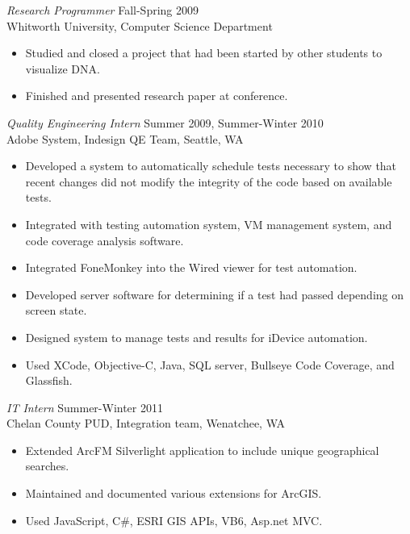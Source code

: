 \documentclass[line,margin]{res}
\begin{document}
\begin{resume}
                {\sl Research Programmer} \hfill             Fall-Spring 2009 \\
                Whitworth University, Computer Science Department
                 \begin{itemize}  \itemsep -2pt %
	                 \item Studied and closed a project that had been started by other students to visualize DNA.
	                 \item Finished and presented research paper at conference.
                 \end{itemize} 				
                 
                 
				{\sl Quality Engineering Intern} \hfill Summer 2009, Summer-Winter 2010 \\
                Adobe System, Indesign QE Team, Seattle, WA
                 \begin{itemize}  \itemsep -2pt %
	                 \item Developed a system to automatically schedule tests necessary to show that recent changes did not modify the integrity of the code based on available tests.
	                \item Integrated with testing automation system, VM management system, and code coverage analysis software.
	                 \item Integrated FoneMonkey into the Wired viewer for test automation.
	                 \item Developed server software for determining if a test had passed depending on screen state.
	                 \item Designed system to manage tests and results for iDevice automation.
	                 \item Used XCode, Objective-C, Java, SQL server, Bullseye Code Coverage, and Glassfish.
 				 \end{itemize}
 				
 				{\sl IT Intern} \hfill Summer-Winter 2011\\
				Chelan County PUD, Integration team, Wenatchee, WA
                 \begin{itemize}  \itemsep -2pt %
					 \item Extended	ArcFM Silverlight application to include unique geographical searches.
					 \item Maintained and documented various extensions for ArcGIS.
					 \item Used JavaScript, C\#, ESRI GIS APIs, VB6, Asp.net MVC.
				 \end{itemize}
					

\end{resume}
\end{document}
